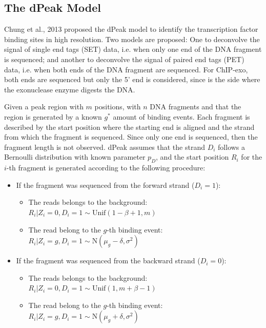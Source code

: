 \documentclass[11pt]{article}\usepackage[]{graphicx}\usepackage[]{color}
\begin{document}
\vspace*{\fill}

\subsection{The dPeak Model}
\label{sec:dpeak}

Chung et al., 2013 proposed the dPeak model to identify the
transcription factor binding sites in high resolution. Two models are
proposed: One to deconvolve the signal of single end tags (SET) data,
i.e. when only one end of the DNA fragment is sequenced; and another
to deconvolve the signal of paired end tags (PET) data, i.e. when both
ends of the DNA fragment are sequenced. For ChIP-exo, both ends are
sequenced but only the 5' end is considered, since is the side where
the exonuclease enzyme digests the DNA.

Given a peak region with $m$ positions, with $n$ DNA fragments and that
the region is generated by a known $g^*$ amount of binding
events. Each fragment is described by the start position where the
starting end is aligned and the strand from which the fragment is
sequenced. Since only one end is sequenced, then the fragment length
is not observed. dPeak assumes that the strand $D_i$ follows a
Bernoulli distribution with known parameter $p_D$, and the start
position $R_i$ for the $i$-th fragment is generated according to the
following procedure:

\begin{itemize}
\item If the fragment was sequenced from the forward strand ($D_i =
  1$):
  \begin{itemize}
  \item The reads belongs to the background: $R_i | Z_i = 0, D_i = 1
    \sim \mbox{Unif}(1 - \beta + 1, m)$
  \item The read belong to the $g$-th binding event: $R_i | Z_i = g,
    D_i = 1 \sim \mbox{N}(\mu_g - \delta , \sigma^2)$
  \end{itemize}
\item If the fragment was sequenced from the backward strand ($D_i =
  0$):
  \begin{itemize}
  \item The reads belongs to the background: $R_i | Z_i = 0, D_i = 1
    \sim \mbox{Unif}(1 , m + \beta  - 1)$
  \item The read belong to the $g$-th binding event: $R_i | Z_i = g,
    D_i = 1 \sim \mbox{N}(\mu_g + \delta , \sigma^2)$
  \end{itemize}
  
\end{itemize}
\end{document}
